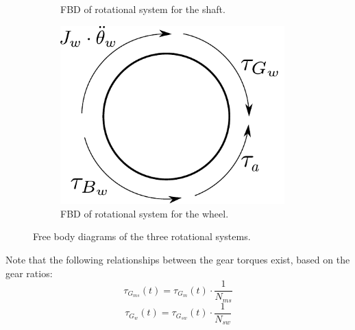 \begin{figure}[H]
\begin{subfigure}[b]{0.3\textwidth}
        \vspace{2mm}
        \caption{FBD of rotational system for the shaft.}
        \label{fig:FBDshaft}
    \end{subfigure}  
    \hspace{4mm} 
\begin{subfigure}[b]{0.3\textwidth}
        \includegraphics[width=0.95\textwidth]{figures/FBD/FBDWheel.pdf}
        \vspace{5mm}
        \caption{FBD of rotational system for the wheel.}
        \label{fig:FBDWheel}
    \end{subfigure}
\caption{Free body diagrams of the three rotational systems.}
\label{fig:FBDMotorShaftWheel}
\end{figure}
Note that the following relationships between the gear torques exist, based on the gear ratios: 
\begin{equation}
\tau_{G_{ms}}(t) = \tau_{G_m}(t) \cdot \frac{1}{N_{ms}}
\label{gearTorqueMotor}
\end{equation}
\begin{equation}
\tau_{G_w}(t) = \tau_{G_{sw}}(t) \cdot \frac{1}{N_{sw}}
\label{gearTorqueWheel}
\end{equation}
\begin{where}
\\
\\
\\
\\
\end{where}

